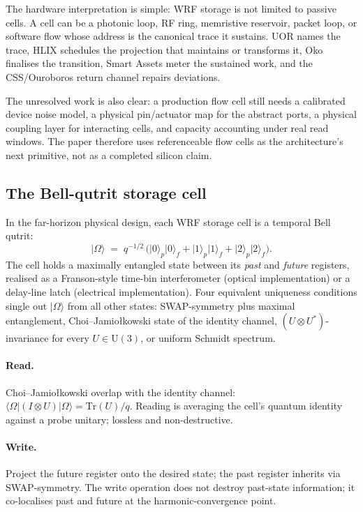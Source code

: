 \documentclass[11pt,letterpaper]{article}
\theoremstyle{remark}
\newcommand{\ket}[1]{\lvert #1\rangle}
\begin{document}
The hardware interpretation is simple: WRF storage is not limited to passive cells. A
cell can be a photonic loop, RF ring, memristive reservoir, packet loop, or software
flow whose address is the canonical trace it sustains. UOR names the trace, HLIX schedules
the projection that maintains or transforms it, Oko finalises the transition, Smart
Assets meter the sustained work, and the CSS/Ouroboros return channel repairs deviations.

The unresolved work is also clear: a production flow cell still needs a calibrated device
noise model, a physical pin/actuator map for the abstract ports, a physical coupling layer
for interacting cells, and capacity accounting under real read windows. The paper therefore uses
referenceable flow cells as the architecture's next primitive, not as a completed silicon
claim.

\subsection{The Bell-qutrit storage cell}

In the far-horizon physical design, each WRF storage cell is a temporal Bell qutrit:
\[
\ket{\Omega} \;=\; q^{-1/2}\,\bigl(\ket{0}_p\ket{0}_f + \ket{1}_p\ket{1}_f + \ket{2}_p\ket{2}_f\bigr).
\]
The cell holds a maximally entangled state between its \emph{past} and \emph{future}
registers, realised as a Franson-style time-bin interferometer (optical implementation)
or a delay-line latch (electrical implementation). Four equivalent uniqueness conditions
single out $\ket{\Omega}$ from all other states: SWAP-symmetry plus maximal entanglement,
Choi--Jamio\l{}kowski state of the identity channel, $(U \otimes U^*)$-invariance for
every $U \in \mathrm{U}(3)$, or uniform Schmidt spectrum.

\paragraph{Read.} Choi--Jamio\l{}kowski overlap with the identity channel:
$\langle\Omega | (I \otimes U) | \Omega\rangle = \mathrm{Tr}(U)/q$. Reading is
averaging the cell's quantum identity against a probe unitary; lossless and
non-destructive.

\paragraph{Write.} Project the future register onto the desired state; the past register
inherits via SWAP-symmetry. The write operation does not destroy past-state information;
it co-localises past and future at the harmonic-convergence point.
\end{document}
